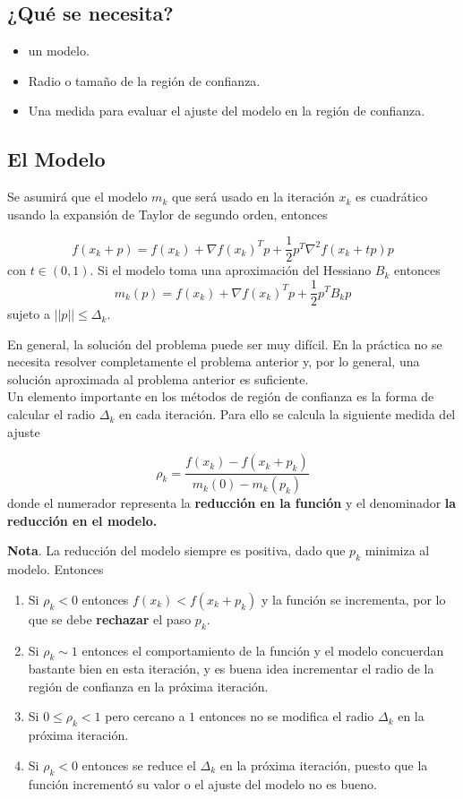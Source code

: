 \documentclass[11pt,letterpaper]{article}
\theoremstyle{definition}
\theoremstyle{definition}
\theoremstyle{definition}
\begin{document}
\subsection{¿Qué se necesita?}
\begin{shaded*}
	\begin{itemize}
		\item un modelo.
		\item Radio o tamaño de la región de confianza.
		\item Una medida para evaluar el ajuste del modelo en la región de confianza.
	\end{itemize}
\end{shaded*}
\subsection{El Modelo}
Se asumirá que el modelo $ m_k $ que será usado en la iteración $ x_k $ es cuadrático usando la expansión de Taylor de segundo orden, entonces
\begin{shaded*}
	\[f(x_k + p) = f(x_k) + \nabla f(x_k)^T p + \dfrac{1}{2} p^T \nabla^2 f(x_k + tp) p \]
	con $ t \in (0,1). $ Si el modelo toma una aproximación del Hessiano $ B_k $ entonces 
	\[m_k(p) = f(x_k) + \nabla f(x_k)^T p + \dfrac{1}{2} p^T B_k p \]
	sujeto a $ ||p|| \leq \Delta_k $.
\end{shaded*}
En general, la solución del problema puede ser muy difícil. En la práctica no se necesita resolver completamente el problema anterior y, por lo general, una solución
aproximada al problema anterior es suficiente.
\\
Un elemento importante en los métodos de región de confianza es la forma de calcular el radio $ \Delta_k $ en cada iteración. Para ello se calcula la siguiente medida del ajuste
\begin{shaded*}
	\[ \rho_k = \dfrac{f(x_k) - f(x_k + p_k)}{m_k (0) - m_k (p_k)} \]
	donde el numerador representa la \textbf{reducción en la función} y el denominador \textbf{la reducción en el modelo.}
\end{shaded*}
\textbf{Nota}. La reducción del modelo siempre es positiva, dado que $ p_k $ minimiza al modelo. Entonces
\begin{enumerate}
	\item Si $ \rho_k < 0 $ entonces $ f(x_k) < f (x_k + p_k) $ y la función se incrementa, por lo que se debe \textbf{rechazar} el paso $ p_k $.
	\item Si $ \rho_k \sim 1 $ entonces el comportamiento de la función y el
	modelo concuerdan bastante bien en esta iteración, y es buena idea incrementar el radio de la región de confianza en la próxima iteración.
	\item Si $ 0 \leq \rho _k < 1 $ pero cercano a $ 1 $ entonces no se modifica el radio $ \Delta_k $ en la próxima iteración.
	\item Si $ \rho _k < 0 $ entonces se reduce el $ \Delta_k $ en la próxima iteración, puesto que la función incrementó su valor o el ajuste del modelo no es bueno.
\end{enumerate}
\end{document}
